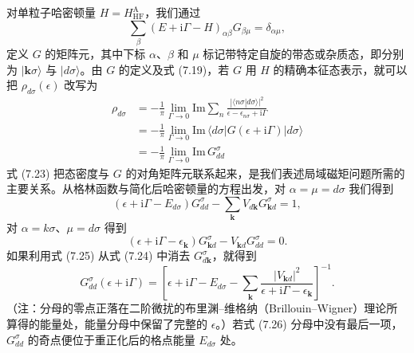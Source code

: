 对单粒子哈密顿量 $H=H_{\mathrm{HF}}^{\mathrm{A}}$，我们通过
\begin{equation*}
\sum_{\beta}(E+\mathrm{i}\Gamma-H)_{\alpha\beta}G_{\beta\mu}=\delta_{\alpha\mu},\tag{7.22}
\end{equation*}
定义 $G$ 的矩阵元，其中下标 $\alpha$、$\beta$ 和 $\mu$ 标记带特定自旋的带态或杂质态，即分别为 $|\mathbf{k}\sigma\rangle$ 与 $|d\sigma\rangle$。由 $G$ 的定义及式 (7.19)，若 $G$ 用 $H$ 的精确本征态表示，就可以把 $\rho_{d\sigma}(\epsilon)$ 改写为
\begin{equation*}
\begin{aligned}
\rho_{d\sigma}&=-\frac{1}{\pi}\lim_{\Gamma\to 0}\mathrm{Im}\sum_{n}\frac{|\langle n\sigma|d\sigma\rangle|^{2}}{\epsilon-\epsilon_{n\sigma}+\mathrm{i}\Gamma}\\
&=-\frac{1}{\pi}\lim_{\Gamma\to 0}\mathrm{Im}\,\langle d\sigma|G(\epsilon+\mathrm{i}\Gamma)|d\sigma\rangle\\
&=-\frac{1}{\pi}\lim_{\Gamma\to 0}\mathrm{Im}\,G_{dd}^{\sigma}
\end{aligned}\tag{7.23}
\end{equation*}
式 (7.23) 把态密度与 $G$ 的对角矩阵元联系起来，是我们表述局域磁矩问题所需的主要关系。从格林函数与简化后哈密顿量的方程出发，对 $\alpha=\mu=d\sigma$ 我们得到
\begin{equation*}
(\epsilon+\mathrm{i}\Gamma-E_{d\sigma})G_{dd}^{\sigma}-\sum_{\mathbf{k}}V_{d\mathbf{k}}G_{\mathbf{k}d}^{\sigma}=1,\tag{7.24}
\end{equation*}
对 $\alpha=k\sigma$、$\mu=d\sigma$ 得到
\begin{equation*}
(\epsilon+\mathrm{i}\Gamma-\epsilon_{\mathbf{k}})G_{\mathbf{k}d}^{\sigma}-V_{\mathbf{k}d}G_{dd}^{\sigma}=0.\tag{7.25}
\end{equation*}
如果利用式 (7.25) 从式 (7.24) 中消去 $G_{d\mathbf{k}}^{\sigma}$，就得到
\begin{equation*}
G_{dd}^{\sigma}(\epsilon+\mathrm{i}\Gamma)=\left[\epsilon+\mathrm{i}\Gamma-E_{d\sigma}-\sum_{\mathbf{k}}\frac{|V_{\mathbf{k}d}|^{2}}{\epsilon+\mathrm{i}\Gamma-\epsilon_{\mathbf{k}}}\right]^{-1}.\tag{7.26}
\end{equation*}
（注：分母的零点正落在二阶微扰的布里渊–维格纳（Brillouin–Wigner）理论所算得的能量处，能量分母中保留了完整的 $\epsilon$。）若式 (7.26) 分母中没有最后一项，$G_{dd}^{\sigma}$ 的奇点便位于重正化后的格点能量 $E_{d\sigma}$ 处。

